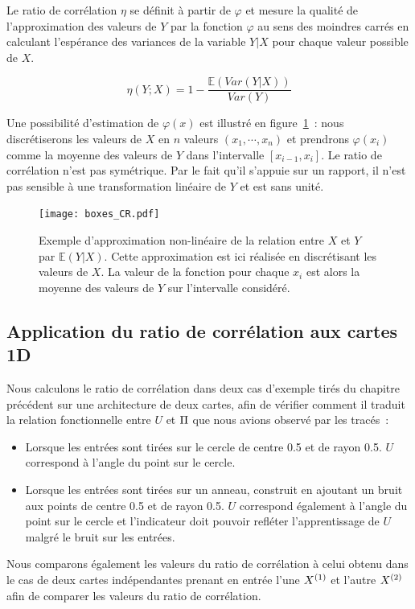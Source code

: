 \documentclass[../main]{subfiles}
\begin{document}
Le ratio de corrélation $\eta$ se définit à partir de $\varphi$ et mesure la qualité de l'approximation des valeurs de $Y$ par la fonction $\varphi$ au sens des moindres carrés en calculant l'espérance des variances de la variable $Y|X$ pour chaque valeur possible de $X$. 

\begin{equation}\label{eq:cr}
   \eta(Y;X) = 1 - \frac{\mathbb{E}(Var(Y|X))}{Var(Y)}
\end{equation}

Une possibilité d'estimation de $\varphi(x)$ est illustré en figure~\ref{fig:cr_box}~: nous discrétiserons les valeurs de $X$ en $n$ valeurs $(x_1, \cdots, x_n)$ et prendrons $\varphi(x_i)$ comme la moyenne des valeurs de $Y$ dans l'intervalle $[x_{i-1}, x_i]$.
Le ratio de corrélation n'est pas symétrique. Par le fait qu'il s'appuie sur un rapport, il n'est pas sensible à une transformation linéaire de $Y$ et est sans unité.

\begin{figure}
    \centering
    \texttt{[image: boxes\_CR.pdf]}
    \caption{Exemple d'approximation non-linéaire de la relation entre $X$ et $Y$ par $\mathbb{E}(Y|X)$. Cette approximation est ici réalisée en discrétisant les valeurs de $X$. La valeur de la fonction pour chaque $x_i$ est alors la moyenne des valeurs de $Y$ sur l'intervalle considéré.\label{fig:cr_box}}
\end{figure}

\subsection{Application du ratio de corrélation aux cartes 1D}

Nous calculons le ratio de corrélation dans deux cas d'exemple tirés du chapitre précédent sur une architecture de deux cartes, afin de vérifier comment il traduit la relation fonctionnelle entre $U$ et $\Pi$ que nous avions observé par les tracés~:
\begin{itemize}
    \item Lorsque les entrées sont tirées sur le cercle de centre 0.5 et de rayon 0.5. $U$ correspond à l'angle du point sur le cercle.
    \item Lorsque les entrées sont tirées sur un anneau, construit en ajoutant un bruit aux points de centre 0.5 et de rayon 0.5. $U$ correspond également à l'angle du point sur le cercle et l'indicateur doit pouvoir refléter l'apprentissage de $U$ malgré le bruit sur les entrées.
\end{itemize}
Nous comparons également les valeurs du ratio de corrélation à celui obtenu dans le cas de deux cartes indépendantes prenant en entrée l'une $X^{({1})}$ et l'autre $X^{({2})}$ afin de comparer les valeurs du ratio de corrélation.
\end{document}
